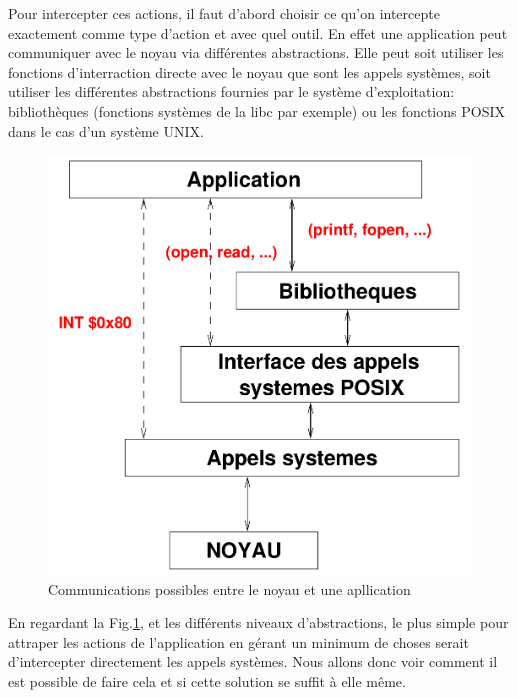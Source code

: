 Pour intercepter ces actions, il faut d'abord choisir ce qu'on intercepte
exactement comme type d'action et avec quel outil. En effet une application peut
communiquer avec le noyau via différentes abstractions. Elle peut soit utiliser
les fonctions d'interraction directe avec le noyau que sont les appels systèmes,
soit utiliser les différentes abstractions fournies par le système
d'exploitation: bibliothèques (fonctions systèmes de la libc par exemple) ou les
fonctions POSIX dans le cas d'un système UNIX.

\begin{figure}[H]
 \centering
 \includegraphics[scale=0.20]{Pictures/Communication_application_noyau.png}
 \caption{Communications possibles entre le noyau et une apllication}
 \label{AS_Communication}
\end{figure}

En regardant la Fig.\ref{AS_Communication}, et les différents niveaux d'abstractions, le plus simple pour attraper les actions de l'application en gérant un minimum de choses serait d'intercepter directement les appels systèmes. Nous allons donc voir comment il est possible de faire cela et si cette solution se suffit à elle même.

